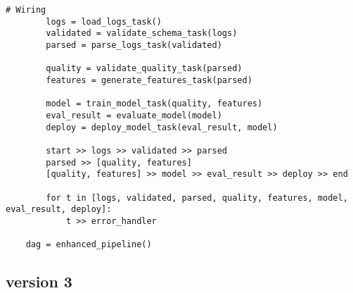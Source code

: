 \begin{lstlisting}[caption={Airflow DAG with parallel data quality validation and feature engineering before training.}, label={lst:airflowdag_parallel}]
        # Wiring
        logs = load_logs_task()
        validated = validate_schema_task(logs)
        parsed = parse_logs_task(validated)
    
        quality = validate_quality_task(parsed)
        features = generate_features_task(parsed)
    
        model = train_model_task(quality, features)
        eval_result = evaluate_model(model)
        deploy = deploy_model_task(eval_result, model)
    
        start >> logs >> validated >> parsed
        parsed >> [quality, features]
        [quality, features] >> model >> eval_result >> deploy >> end
    
        for t in [logs, validated, parsed, quality, features, model, eval_result, deploy]:
            t >> error_handler
    
    dag = enhanced_pipeline()
\end{lstlisting}

    


\subsection{version 3}


